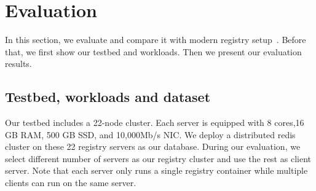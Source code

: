 \section{ Evaluation}
\label{sec:Evaluation}


In this section, we evaluate \sysname and compare it with
modern registry setup~\cite{dockerworkload}.
Before that,
we first show our testbed and workloads.
Then we present our evaluation results.
\subsection{Testbed, workloads and dataset}

Our testbed includes 
a 22-node cluster.
Each server is equipped with 8 cores,16 GB RAM, 500 GB SSD, and 10,000Mb/s NIC. 
We deploy a distributed redis cluster on these 22 registry servers as our database.
During our evaluation,
we select different number of servers as our registry cluster
and use the rest as client server.
Note that each server only runs a single registry container
while multiple clients can run on the same server.

